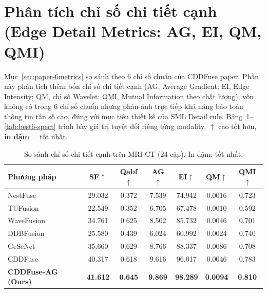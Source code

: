 \section{Phân tích chỉ số chi tiết cạnh (Edge Detail Metrics: AG, EI, QM, QMI)}
\label{sec:best-6metrics}

Mục~\ref{sec:paper-6metrics} so sánh theo 6 chỉ số chuẩn của CDDFuse paper. Phần này phân tích thêm bốn chỉ số chi tiết cạnh (AG, Average Gradient; EI, Edge Intensity; QM, chỉ số Wavelet; QMI, Mutual Information theo chất lượng), vốn không có trong 6 chỉ số chuẩn nhưng phản ánh trực tiếp khả năng bảo toàn thông tin tần số cao, đúng với mục tiêu thiết kế của SML Detail rule. Bảng~\ref{tab:best6-ct}--\ref{tab:best6-spect} trình bày giá trị tuyệt đối riêng từng modality, $\uparrow$ cao tốt hơn, \textbf{in đậm} = tốt nhất.

\begin{table}[H]
\centering\small
\caption[Chỉ số chi tiết cạnh trên MRI-CT (24 cặp)]{So sánh chỉ số chi tiết cạnh trên MRI-CT (24 cặp). In đậm: tốt nhất.}
\label{tab:best6-ct}
\setlength{\tabcolsep}{4.5pt}
\begin{tabular}{lcccccc}
\toprule
\textbf{Phương pháp} & \textbf{SF}$\uparrow$ & \textbf{Qabf}$\uparrow$ & \textbf{AG}$\uparrow$ & \textbf{EI}$\uparrow$ & \textbf{QM}$\uparrow$ & \textbf{QMI}$\uparrow$ \\
\midrule
  NestFuse~\cite{li2020nestfuse}   & 29.032 & 0.372 & 7.539 & 74.942 & 0.0016 & 0.723 \\
  TUFusion~\cite{zhao2024tufusion} & 22.549 & 0.352 & 6.705 & 67.478 & 0.0010 & 0.592 \\
  WaveFusion~\cite{wang2025wavefusion} & 34.761 & 0.625 & 8.502 & 85.732 & 0.0046 & 0.701 \\
  DDBFusion~\cite{zhang2025ddbfusion}  & 25.580 & 0.439 & 6.024 & 60.992 & 0.0024 & 0.740 \\
  GeSeNet~\cite{li2023gesenet}    & 35.660 & 0.629 & 8.766 & 88.337 & 0.0086 & 0.708 \\
  CDDFuse~\cite{zhao2023cddfuse}  & 40.317 & 0.618 & 9.616 & 96.017 & 0.0046 & 0.783 \\
  \midrule
  \textbf{CDDFuse-AG (Ours)} & \textbf{41.612} & \textbf{0.645} & \textbf{9.869} & \textbf{98.289} & \textbf{0.0094} & \textbf{0.810} \\
\bottomrule
\end{tabular}
\end{table}

